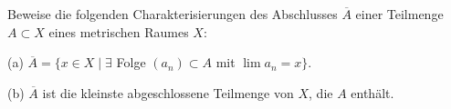 \begin{prob}
Beweise die folgenden Charakterisierungen des Abschlusses
$\overline{A}$ einer Teilmenge $A\subset X$ eines metrischen Raumes $X$:

(a) $\overline{A} = \{x\in X\mid\exists$ Folge $(a_n)\subset A$ mit
$\lim a_n=x\}$.

(b) $\overline{A}$ ist die kleinste abgeschlossene Teilmenge von $X$,
die $A$ enth\"alt. 
\end{prob}
